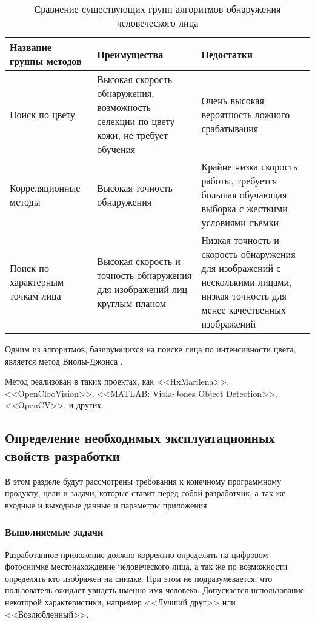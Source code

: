 \begin{table}[hbt]
    \centering
    \begin{tabu}[\textwidth]{|X[c]|X[c]|X[c]|}
        \hline
        Название группы методов & Преимущества & Недостатки \\
        \hline
        Поиск по цвету & Высокая скорость обнаружения,
            возможность селекции по цвету кожи, не требует обучения &
            Очень высокая вероятность ложного срабатывания \\
        \hline
        Корреляционные методы & Высокая точность обнаружения &
            Крайне низка скорость работы, требуется большая обучающая выборка
            с жесткими условиями съемки \\
        \hline
        Поиск по характерным точкам лица & Высокая скорость и точность
            обнаружения для изображений лиц круглым планом &
            Низкая точность и скорость обнаружения для изображений с несколькими
            лицами, низкая точность для менее качественных изображений \\
        \hline
    \end{tabu}
    \caption{Сравнение существующих групп алгоритмов обнаружения
        человеческого лица}
    \label{tables:finding_methods}
\end{table}

Одним из алгоритмов, базирующихся на поиске лица по интенсивности цвета, является
метод Виолы-Джонса \cite{viola_jones_2}.

Метод реализован в таких проектах, как <<HxMarilena>>, <<OpenClooVision>>, <<MATLAB: Viola-Jones
Object Detection>>, <<OpenCV>>, и других.

\subsection{Определение необходимых эксплуатационных свойств разработки}

В этом разделе будут рассмотрены требования к конечному программному продукту,
цели и задачи, которые ставит перед собой разработчик, а так же входные
и выходные данные и параметры приложения.

\subsubsection{Выполняемые задачи}

Разработанное приложение должно корректно определять на цифровом фотоснимке
местонахождение человеческого лица, а так же по возможности определять
кто изображен на снимке. При этом не подразумевается, что пользователь
ожидает увидеть именно имя человека. Допускается использование некоторой
характеристики, например <<Лучший друг>> или <<Возлюбленный>>.

